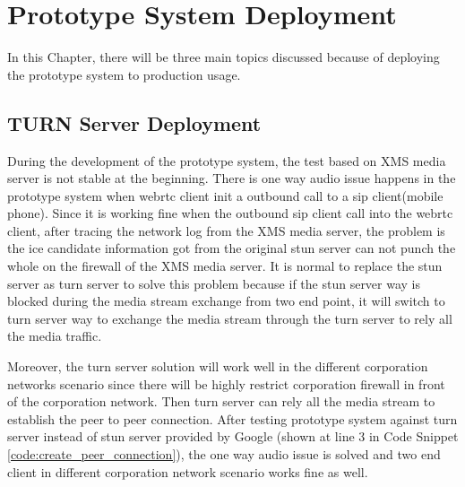 \chapter{Prototype System Deployment}
\label{chp:sys_deploy}

\noindent In this Chapter, there will be three main topics discussed because of deploying the prototype system to production usage.

\section{TURN Server Deployment}

\par During the development of the prototype system, the test based on XMS media server is not stable at the beginning. There is one way audio issue happens in the prototype system when \gls{webrtc} client init a outbound call to a \gls{sip} client(mobile phone). Since it is working fine when the outbound \gls{sip} client call into the \gls{webrtc} client, after tracing the network log from the XMS media server, the problem is the \gls{ice} candidate information got from the original \gls{stun} server can not punch the whole on the firewall of the XMS media server. It is normal to replace the \gls{stun} server as \gls{turn} server to solve this problem because if the \gls{stun} server way is blocked during the media stream exchange from two end point, it will switch to \gls{turn} server way to exchange the media stream through the \gls{turn} server to rely all the media traffic.

\par Moreover, the \gls{turn} server solution will work well in the different corporation networks scenario since there will be highly restrict corporation firewall in front of the corporation network. Then \gls{turn} server can rely all the media stream to establish the peer to peer connection. After testing prototype system against \gls{turn} server instead of \gls{stun} server provided by Google (shown at line 3 in Code Snippet \ref{code:create_peer_connection}), the one way audio issue is solved and two end client in different corporation network scenario works fine as well.

